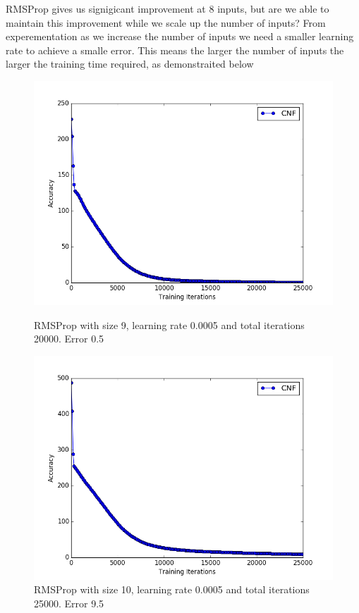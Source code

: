 \documentclass{article}
\theoremstyle{definition}
\begin{document}
RMSProp gives us signigicant improvement at 8 inputs, but are we able to maintain this improvement while we scale up the number of inputs? From experementation as we increase the number of inputs we need a smaller learning rate to achieve a smalle error. This means the larger the number of inputs the larger the training time required, as demonstraited below

\begin{figure}[H]
\centering
  \begin{minipage}[b]{0.4\textwidth}
    \includegraphics[width=\textwidth]{CNF-OP-RMS-03.png}
    \caption{RMSProp with size 9, learning rate 0.0005 and total iterations 20000. Error 0.5}
  \end{minipage}
  \hfill
  \begin{minipage}[b]{0.4\textwidth}
    \includegraphics[width=\textwidth]{CNF-OP-RMS-04.png}
    \caption{RMSProp with size 10, learning rate 0.0005 and total iterations 25000. Error 9.5}
  \end{minipage}
\end{figure}
\end{document}
